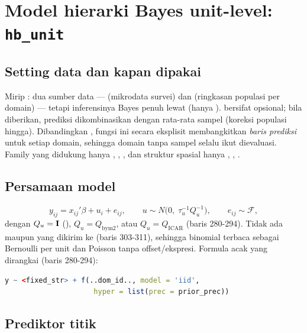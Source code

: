 \section{Model hierarki Bayes unit-level: \texttt{hb\_unit}}\label{sec:hbunit}

\subsection{Setting data dan kapan dipakai}\label{sec:hbunit-setting}

Mirip : dua sumber data ---  (mikrodata
survei) dan  (ringkasan populasi per domain) --- tetapi inferensinya
Bayes penuh lewat  (hanya ). 
bersifat opsional; bila diberikan, prediksi dikombinasikan dengan rata-rata
sampel (koreksi populasi hingga). Dibandingkan , fungsi ini secara eksplisit
membangkitkan \emph{baris prediksi} untuk setiap domain, sehingga domain tanpa
sampel selalu ikut dievaluasi. Family yang didukung hanya
, , , dan struktur spasial hanya
, , .

\subsection{Persamaan model}\label{sec:hbunit-model}

\begin{equation}
  y_{ij}=x_{ij}'\beta+u_i+e_{ij},\qquad
  u\sim N\bigl(0,\;\tau_u^{-1}Q_u^{-1}\bigr),\qquad
  e_{ij}\sim\mathcal F,
  \label{eq:hbunit-model}
\end{equation}
dengan $Q_u=\mathbf{I}$ (), $Q_u=Q_{\text{bym2}}$,
atau $Q_u=Q_{\text{ICAR}}$ (baris 280-294). Tidak ada  maupun
 yang dikirim ke  (baris 303-311), sehingga binomial
terbaca sebagai Bernoulli per unit dan Poisson tanpa offset/ekspresi.
Formula acak yang dirangkai (baris 280-294):
\begin{lstlisting}[language=R]
y ~ <fixed_str> + f(..dom_id.., model = 'iid',
                     hyper = list(prec = prior_prec))
\end{lstlisting}

\subsection{Prediktor titik}\label{sec:hbunit-prediktor}

